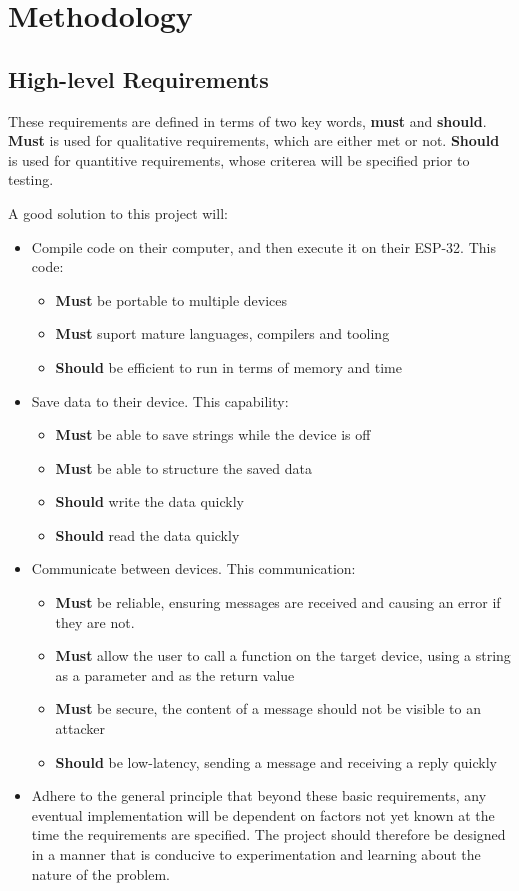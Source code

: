 \documentclass{article}
\begin{document}
\section{Methodology}
\subsection{High-level Requirements}
These requirements are defined in terms of two key words, \textbf{must} and \textbf{should}. \textbf{Must} is used for qualitative requirements, which are either met or not. \textbf{Should} is used for quantitive requirements, whose criterea will be specified prior to testing.

A good solution to this project will:
\begin{itemize}
\item Compile code on their computer, and then execute it on their ESP-32. This code:
\begin{itemize}
  \item \textbf{Must} be portable to multiple devices
  \item \textbf{Must} suport mature languages, compilers and tooling
  \item \textbf{Should} be efficient to run in terms of memory and time
\end{itemize}
\item Save data to their device. This capability:
\begin{itemize}
  \item \textbf{Must} be able to save strings while the device is off
  \item \textbf{Must} be able to structure the saved data
  \item \textbf{Should} write the data quickly
  \item \textbf{Should} read the data quickly
\end{itemize}
\item Communicate between devices. This communication:
\begin{itemize}
  \item \textbf{Must} be reliable, ensuring messages are received and causing an error if they are not.
  \item \textbf{Must} allow the user to call a function on the target device, using a string as a parameter and as the return value
  \item \textbf{Must} be secure, the content of a message should not be visible to an attacker
  \item \textbf{Should} be low-latency, sending a message and receiving a reply quickly
\end{itemize}
\item Adhere to the general principle that beyond these basic requirements, any eventual implementation will be dependent on factors not yet known at the time the requirements are specified. The project should therefore be designed in a manner that is conducive to experimentation and learning about the nature of the problem.
\end{itemize}
\end{document}
